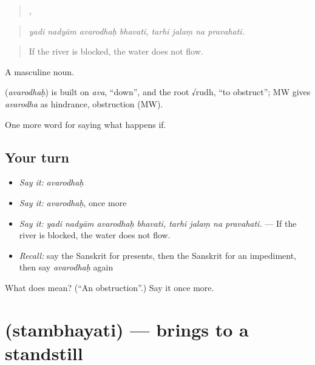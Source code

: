 \begin{quote}
   ,    
\end{quote}

\begin{quote}
\emph{yadi nadyām avarodhaḥ bhavati, tarhi jalaṃ na pravahati.}
\end{quote}

\begin{quote}
If the river is blocked, the water does not flow.
\end{quote}

A masculine noun.

\begin{cousinweb}
\textbf{} (\emph{avarodhaḥ}) is built on \emph{ava}, \textquotedblleft{}down\textquotedblright{}, and the root √rudh, \textquotedblleft{}to obstruct\textquotedblright{}; MW gives \emph{avarodha} as hindrance, obstruction (MW).
\end{cousinweb}

\begin{grammarlens}[title={What you've built}]
One more word for saying what happens if.
\end{grammarlens}

\subsection*{Your turn}
\begin{itemize}
\raggedright
  \item \emph{Say it:} \emph{avarodhaḥ}
  \item \emph{Say it:} \emph{avarodhaḥ}, once more
  \item \emph{Say it:} \emph{yadi nadyām avarodhaḥ bhavati, tarhi jalaṃ na pravahati.} — If the river is blocked, the water does not flow.
  \item \emph{Recall:} say the Sanskrit for presents, then the Sanskrit for an impediment, then say \emph{avarodhaḥ} again
\end{itemize}

\begin{tcolorbox}[breakable,colback=teal!4,colframe=teal!35!black,title={Before you move on}]
What does  mean? (\textquotedblleft{}An obstruction\textquotedblright{}.) Say it once more.
\end{tcolorbox}
\section[\texorpdfstring{\sk{स्तम्भयति} (stambhayati)}{स्तम्भयति (stambhayati)}]{ (stambhayati) — brings to a standstill}

